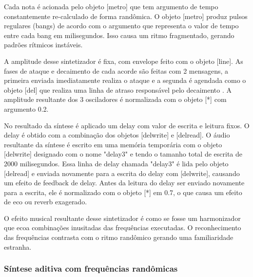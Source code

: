 \documentclass{ppgmus}
\begin{document}
Cada nota é acionada pelo objeto [metro] que tem argumento de tempo constantemente
re-calculado de forma randômica. O objeto [metro] produz pulsos regulares (bangs) de
acordo com o argumento que representa o valor de tempo entre cada bang em milisegundos.
Isso causa um ritmo fragmentado, gerando padrões rítmicos instáveis.

A amplitude desse sintetizador é fixa, com envelope feito com o
objeto [line\texttildelow]. As fases de ataque e decaimento de cada acorde 
são feitas com 2 mensagens, a primeira enviada imediatamente realiza o ataque 
e a segunda é agendada como o objeto [del] que realiza uma linha de atraso
responsável pelo decaimento . A amplitude resultante dos 3 osciladores é normalizada
com o objeto [*\texttildelow] com argumento 0.2.

No resultado da síntese é aplicado um delay com valor de escrita e leitura fixos.
O delay é obtido com a combinação dos objetos [delwrite\texttildelow] e 
[delread\texttildelow]. O áudio resultante da síntese é escrito em uma memória 
temporária com o objeto [delwrite\texttildelow] designado com o nome "delay3"
e tendo o tamanho total de escrita de 2000 milisegundos. Essa linha de delay
chamada "delay3" é lida pelo objeto [delread\texttildelow] e enviada
novamente para a escrita do delay com [delwrite\texttildelow], causando um
efeito de feedback de delay. Antes da leitura do delay ser enviado novamente
para a escrita, ele é normalizado com o objeto [*\texttildelow] em 0.7, o
que causa um efeito de eco ou reverb exagerado. 

O efeito musical resultante desse sintetizador é como se fosse um harmonizador que ecoa combinações inusitadas
das frequências executadas. O reconhecimento das frequências contrasta com o
ritmo randômico gerando uma familiaridade estranha.



\subsubsection{Síntese aditiva com frequências randômicas}
\end{document}
